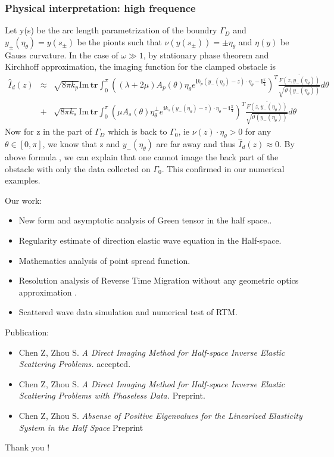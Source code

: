 \documentclass[utf-8,8pt]{beamer}
\renewcommand{\i}{\mathbf{i}}
\renewcommand{\Im}{\mathrm{Im}\,}
\newcommand{\Ga}{\Gamma}
\renewcommand{\i}{\mathbf{i}}
\renewcommand{\Im}{\mathrm{Im}\,}
\newcommand{\ben}{\begin{eqnarray*}}
\newcommand{\een}{\end{eqnarray*}}
\begin{document}
\begin{frame}
\frametitle{Physical interpretation: high frequence}
Let y(s) be the arc length parametrization of the boundry $\Ga_D$ and $y_{\pm}(\eta_\theta)=y(s_{\pm})$ be the pionts such that $\nu(y(s_{\pm}))=\pm\eta_\theta$ and $\eta(y)$ be Gauss curvature. In the case of $\omega\gg1$, by stationary phase theorem and Kirchhoff approximation, the imaging function for the clamped obstacle is
\ben
\hat{I}_d(z)&\approx&\sqrt{8\pi k_p}\Im\mathbf{tr} \int_{0}^{\pi}((\lambda+2\mu)A_p(\theta)\eta_\theta e^{\i k_p (y_-(\eta_\theta)-z)\cdot \eta_\theta-\i\frac{\pi}{4}})^T\frac{\overline{F(z,y_-(\eta_\theta))}}{\sqrt{\vartheta(y_-(\eta_\theta))}}d\theta \\
&+&\sqrt{8\pi k_s}\Im\mathbf{tr} \int_{0}^{\pi}(\mu A_s(\theta)\eta_\theta^\perp e^{\i k_s (y_-(\eta_\theta)-z)\cdot \eta_\theta-\i\frac{\pi}{4}})^T\frac{\overline{F(z,y_-(\eta_\theta))}}{\sqrt{\vartheta(y_-(\eta_\theta))}}d\theta
\een
Now for z in the part of $\Ga_D$ which is back to $\Ga_0$, ie $\nu(z)\cdot\eta_\theta>0$ for any $\theta\in[0,\pi]$, we know that z and $y_{-}(\eta_\theta)$ are far away and thus $\hat{I}_d(z)\approx0$. By above formula , we can explain that one cannot image the back part of the obstacle with only the data collected on $\Ga_0$. This confirmed in our numerical examples.
\end{frame}


\begin{frame}
Our work:
\begin{itemize}
\item New form and asymptotic analysis of Green tensor in the half space..
\item Regularity estimate of direction elastic wave equation in the Half-space.
\item Mathematics analysis of point spread function.
\item Resolution analysis of Reverse Time Migration without any geometric optics approximation .
\item Scattered wave data simulation and numerical test of RTM.
\end{itemize}
Publication:
\begin{itemize}
\item Chen Z, Zhou S. {\it A Direct Imaging Method for Half-space Inverse Elastic Scattering Problems.} accepted.
\item Chen Z, Zhou S. {\it A Direct Imaging Method for Half-space Inverse Elastic Scattering Problems with Phaseless Data.} Preprint.
\item Chen Z, Zhou S. {\it Absense of Positive Eigenvalues for the Linearized Elasticity System in the Half
	Space} Preprint
\end{itemize}
\vspace{1cm}
\begin{flushright}
  \LARGE \textcolor[rgb]{1.00,0.00,0.00}{Thank you !}
\end{flushright}
\end{frame}
\end{document}
